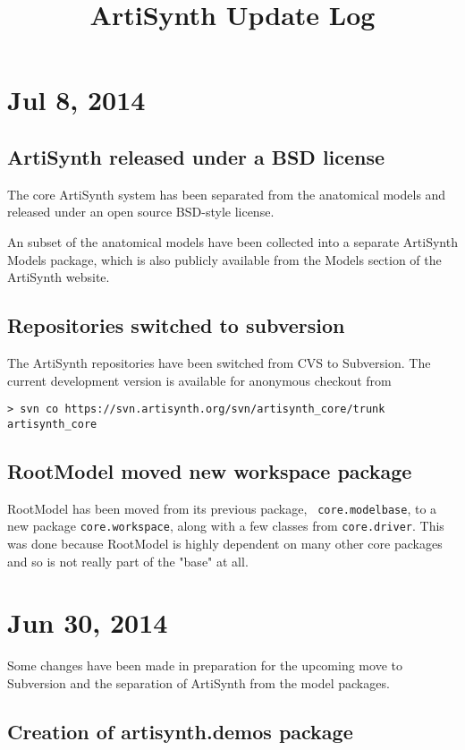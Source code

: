 \documentclass{article}
\title{ArtiSynth Update Log}
\date{}
\begin{document}
\section*{Jul 8, 2014}

\subsection*{ArtiSynth released under a BSD license}

The core ArtiSynth system has been separated from the anatomical
models and released under an open source BSD-style license.

An subset of the anatomical models have been collected into a separate
ArtiSynth Models package, which is also publicly available from the
{\sf Models} section of the ArtiSynth website.

\subsection*{Repositories switched to subversion}

The ArtiSynth repositories have been switched from CVS to Subversion.
The current development version is available for anonymous checkout
from
\begin{verbatim}
> svn co https://svn.artisynth.org/svn/artisynth_core/trunk artisynth_core
\end{verbatim}

\subsection*{RootModel moved new workspace package}

RootModel has been moved from its previous package, {\tt
core.modelbase}, to a new package {\tt core.workspace}, along with a
few classes from {\tt core.driver}. This was done because RootModel is
highly dependent on many other core packages and so is not really part
of the "base" at all.

\section*{Jun 30, 2014}

Some changes have been made in preparation for the upcoming move to
Subversion and the separation of ArtiSynth from the model packages.

\subsection*{Creation of artisynth.demos package}
\end{document}

